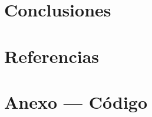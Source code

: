\documentclass[]{elsarticle}
\begin{document}
\section{Conclusiones}
\label{sec:conclusions}


\section*{Referencias}
% 
% 

\section*{Anexo --- Código}
\label{sec:annex}

\end{document}
